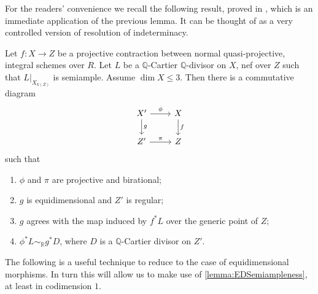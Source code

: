 	
	For the readers' convenience we recall the following result, proved in \cite[Lemma 9.24]{bhatt2020}, which is an immediate application of the previous lemma. It can be thought of as a very controlled version of resolution of indeterminacy.
	
	\begin{lemma}\label{two}
		Let $f \colon X \to Z$ be a projective contraction between normal quasi-projective, integral schemes over $R$.
		Let $L$ be a $\mathbb{Q}$-Cartier $\mathbb{Q}$-divisor on $X$, nef over $Z$ such that $L|_{X_{k(Z)}}$ is semiample.
		Assume $\dim X \leq 3$. Then there is a commutative diagram 
		\[\begin{tikzcd}
		X' \arrow[d, "g"] \arrow[r, "\phi"] & X \arrow[d, "f"] \\
		Z' \arrow[r, "\pi"]                 & Z               
		\end{tikzcd}\]
		such that 
		\begin{enumerate}
			\item $\phi$ and $\pi$ are projective and birational;
			\item  $g$ is equidimensional and $Z'$ is regular;
			\item $g$ agrees with the map induced by $f^*L$ over the generic point of $Z$;
			\item $\phi^{*}L \sim_{\mathbb{R}} g^{*}D$, where $D$ is a $\mathbb{Q}$-Cartier divisor on $Z'$.
		\end{enumerate}  
	\end{lemma}
	
	The following is a useful technique to reduce to the case of equidimensional morphisms. In turn this will allow us to make use of \autoref{lemma:EDSemiampleness}, at least in codimension $1$.
	
